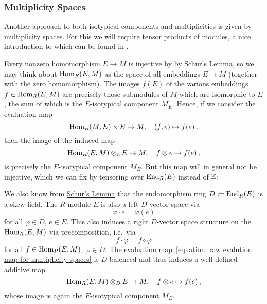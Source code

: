 \subsubsection{Multiplicity Spaces}


\begin{fluff}
  Another approach to both isotypical components and multiplicities is given by multiplicity spaces.
  For this we will require tensor products of modules, a nice introduction to which can be found in \cite[Chapter 10.4]{DummitFoote2004}.
\end{fluff}


\begin{fluff}
  \label{fluff: introducting multiplicity spaces}
  Every nonzero homomorphism $E \to M$ is injective by by \hyperref[proposition: schurs lemma for modules]{Schur’s Lemma}, so we may think about $\operatorname{Hom}_R(E,M)$ as the space of all embeddings $E \to M$ (together with the zero homomorphism).
  The images $f(E)$ of the various embeddings $f \in \operatorname{Hom}_R(E,M)$ are precisely those submodules of $M$ which are isomorphic to $E$, the sum of which is the $E$-isotypical component $M_E$.
  Hence, if we consider the evaluation map
  \begin{equation}
    \label{equation: raw evalution map for multiplicity spaces}
            \operatorname{Hom}_R(M,E) \times E
    \to     M,
    \quad   (f, e)
    \mapsto f(e) \,,
  \end{equation}
  then the image of the induced map
  \[            
            \operatorname{Hom}_R(E,M) \mathbin{\otimes}_{\mathbb{Z}} E
    \to     M,
    \quad   f \mathbin{\otimes} e
    \mapsto f(e) \,,
  \]
  is precisely the $E$-isotypical component $M_E$.
  But this map will in general not be injective, which we can fix by tensoring over $\operatorname{End}_R(E)$ instead of $\mathbb{Z}$:
  
  We also know from \hyperref[proposition: schurs lemma for modules]{Schur’s Lemma} that the endomorphism ring $D \coloneqq \operatorname{End}_R(E)$ is a skew field.
  The $R$-module $E$ is also a left $D$-vector space via
  \[
      \varphi \cdot e
    = \varphi(e)
  \]
  for all $\varphi \in D$, $e \in E$.
  This also induces a right $D$-vector space structure on the $\operatorname{Hom}_R(E,M)$ via precomposition, i.e.\ via
  \[
      f \cdot \varphi
    = f \circ \varphi
  \]
  for all $f \in \operatorname{Hom}_R(E,M)$, $\varphi \in D$.
  The evaluation map~\eqref{equation: raw evalution map for multiplicity spaces} is $D$-balenced and thus induces a well-defined additive map
  \[
            \operatorname{Hom}_R(E,M) \mathbin{\otimes}_D E
    \to     M,
    \quad   f \mathbin{\otimes} e
    \mapsto f(e) \,,
  \]
  whose image is again the $E$-isotypical component $M_E$.
  

\end{fluff}
